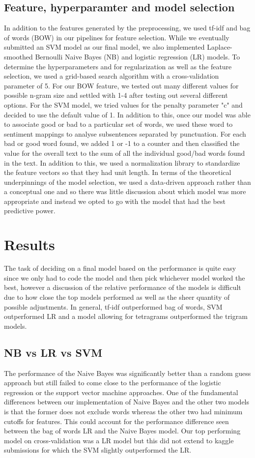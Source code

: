 \documentclass{amsart}
\theoremstyle{definition}
\theoremstyle{remark}
\numberwithin{equation}{section}
\begin{document}
\subsection{Feature, hyperparamter and model selection}
In addition to the features generated by the preprocessing, we used tf-idf and bag of words (BOW) in our pipelines for feature selection.  While we eventually submitted an SVM model as our final model, we also implemented Laplace-smoothed Bernoulli Naive Bayes (NB) and logistic regression (LR) models.  To determine the hyperparameters and for regularization as well as the feature selection, we used a grid-based search algorithm with a cross-validation parameter of 5.  For our BOW feature, we tested out many different values for possible n-gram size and settled with 1-4 after testing out several different options.  For the SVM model, we tried values for the penalty parameter "c" and decided to use the default value of 1.  In addition to this, once our model was able to associate good or bad to a particular set of words, we used these word to sentiment mappings to analyse subsentences separated by punctuation.  For each bad or good word found, we added 1 or -1 to a counter and then classified the value for the overall text to the sum of all the individual good/bad words found in the text.  In addition to this, we used a normalization library to standardize the feature vectors so that they had unit length.  In terms of the theoretical underpinnings of the model selection, we used a data-driven approach rather than a conceptual one and so there was little discussion about which model was more appropriate and instead we opted to go with the model that had the best predictive power.

\section{Results}
The task of deciding on a final model based on the performance is quite easy since we only had to code the model and then pick whichever model worked the best, however a discussion of the relative performance of the models is difficult due to how close the top models performed as well as the sheer quantity of possible adjustments.  In general, tf-idf outperformed bag of words, SVM outperformed LR and a model allowing for tetragrams outperformed the trigram models.
\subsection{NB vs LR vs SVM}
The performance of the Naive Bayes was significantly better than a random guess approach but still failed to come close to the performance of the logistic regression or the support vector machine approaches.  One of the fundamental differences between our implementation of Naive Bayes and the other two models is that the former does not exclude words whereas the other two had minimum cutoffs for features.  This could account for the performance difference seen between the bag of words LR and the Naive Bayes model.  Our top performing model on cross-validation was a LR model but this did not extend to kaggle submissions for which the SVM slightly outperformed the LR.
\end{document}
